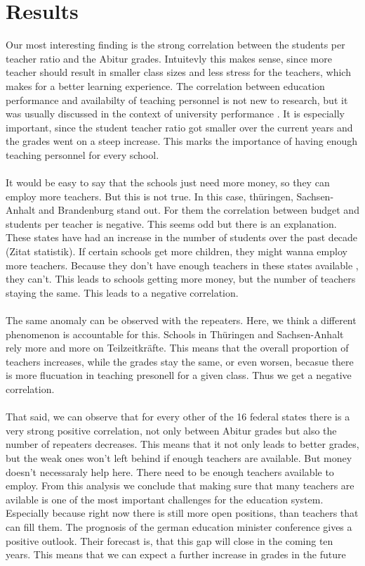 \section*{Results}
Our most interesting finding is the strong correlation between the students per teacher ratio and the Abitur grades. Intuitevly this makes sense, since more teacher should result in smaller class sizes and less stress for the teachers, which makes for a better learning experience. The correlation between education performance and availabilty of teaching personnel is not new to research, but it was usually discussed in the context of university performance  \cite{doi:10.1080/00220485.1984.10845072}. It is especially important, since the student teacher ratio got smaller over the current years and the grades went on a steep increase. This marks the importance of having enough teaching personnel for every school.\\\\
It would be easy to say that the schools just need more money, so they can employ more teachers. But this is not true. In this case, thüringen, Sachsen-Anhalt and Brandenburg stand out. For them the correlation between budget and students per teacher is negative. This seems odd but there is an explanation. These states have had an increase in the number of students over the past decade (Zitat statistik).  If certain schools get more children, they might wanna employ more teachers. Because they don't have enough teachers in these states available \cite{Kultusministerkonferenz}, they can't. This leads to schools getting more money, but the number of teachers staying the same. This leads to a negative correlation.\\\\
The same anomaly can be observed with the repeaters. Here, we think a different phenomenon is accountable for this. Schools in Thüringen and Sachsen-Anhalt rely more and more on Teilzeitkräfte. This means that the overall proportion of teachers increases, while the grades stay the same, or even worsen, becasue there is more flucuation in teaching presonell for a given class. Thus we get a negative correlation.\\\\
That said, we can observe that for every other of the 16 federal states there is a very strong positive correlation, not only between Abitur grades but also the number of repeaters decreases. This means that it not only leads to better grades, but the weak ones won't left behind if enough teachers are available. But money doesn't necessaraly help here. There need to be enough teachers available to employ. From this analysis we conclude that making sure that many teachers are avilable is one of the most important challenges for the education system. Especially because right now there is still more open positions, than teachers that can fill them. The prognosis of the german education minister conference \cite{Kultusministerkonferenz} gives a positive outlook. Their forecast is, that this gap will close in the coming ten years. This means that we can expect a further increase in grades in the future\\\\
